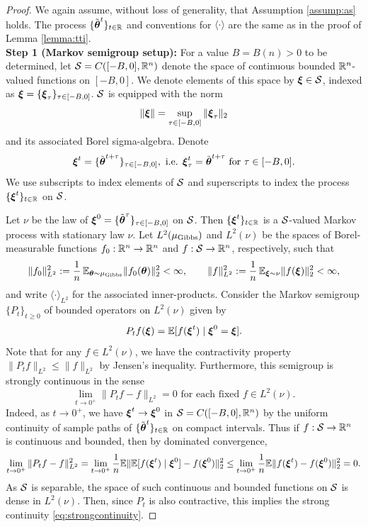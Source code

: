 \begin{proof}
We again assume, without loss of generality, that Assumption \ref{assump:as}
holds. The process $\{\tilde{\boldsymbol{\theta}}^t\}_{t \in \mathbb{R}}$ and conventions
for $\langle \cdot \rangle$ are the same as in the proof
of Lemma \ref{lemma:tti}.\\

{\bf Step 1 (Markov semigroup setup):} 
For a value $B=B(n)>0$ to be determined, let
$\mathcal{S}=C([-B,0],\mathbb{R}^n)$ denote the space of continuous bounded
$\mathbb{R}^n$-valued functions on $[-B,0]$. We denote elements of this space by
$\boldsymbol{\xi} \in \mathcal{S}$, indexed as $\boldsymbol{\xi}=\{\boldsymbol{\xi}_\tau\}_{\tau \in [-B,0]}$.
$\mathcal{S}$ is equipped with the norm
\[\|\boldsymbol{\xi}\|=\sup_{\tau \in [-B,0]} \|\boldsymbol{\xi}_\tau\|_2\]
and its associated Borel sigma-algebra. Denote
\[\boldsymbol{\xi}^t=\{\tilde {\boldsymbol{\theta}}^{t+\tau}\}_{\tau \in [-B,0]},
\text{ i.e. } \boldsymbol{\xi}_\tau^t=\tilde {\boldsymbol{\theta}}^{t+\tau} \text{ for } \tau \in
[-B,0].\]
We use subscripts to index elements of $\mathcal{S}$
and superscripts to index the process $\{\boldsymbol{\xi}^t\}_{t \in \mathbb{R}}$ on $\mathcal{S}$.

Let $\nu$ be the law of $\boldsymbol{\xi}^0=\{\tilde{\boldsymbol{\theta}}^\tau\}_{\tau \in [-B,0]}$
on $\mathcal{S}$. Then $\{\boldsymbol{\xi}^t\}_{t \in \mathbb{R}}$ is a
$\mathcal{S}$-valued Markov process with stationary law $\nu$.
Let $L^2(\mu_{\mathrm{Gibbs}})$ and $L^2(\nu)$ be the spaces of
Borel-measurable functions $f_0:\mathbb{R}^n \to \mathbb{R}^n$ and
$f:\mathcal{S} \to \mathbb{R}^n$, respectively, such that
\[\|f_0\|_{L^2}^2:=\frac{1}{n}\,\mathbb{E}_{\boldsymbol{\theta} \sim \mu_{\mathrm{Gibbs}}}
\|f_0(\boldsymbol{\theta})\|_2^2<\infty,\qquad \|f\|_{L^2}^2:=
\frac{1}{n}\,\mathbb{E}_{\boldsymbol{\xi} \sim \nu} \|f(\boldsymbol{\xi})\|_2^2<\infty,\]
and write $\langle \cdot \rangle_{L^2}$ for the associated inner-products.
Consider the Markov semigroup $\{P_t\}_{t \geq 0}$ of
bounded operators on $L^2(\nu)$ given by
\[P_t f(\boldsymbol{\xi})=\mathbb{E}[f(\boldsymbol{\xi}^t) \mid \boldsymbol{\xi}^0=\boldsymbol{\xi}].\]
Note that for any $f \in L^2(\nu)$, we have the contractivity property
$\|P_tf\|_{L^2} \leq \|f\|_{L^2}$ by Jensen's inequality. Furthermore,
this semigroup is strongly continuous in the sense
\begin{equation}\label{eq:strongcontinuity}
\lim_{t \to 0^+} \|P_tf-f\|_{L^2}=0 \text{ for each fixed } f \in L^2(\nu).
\end{equation}
Indeed, as $t \to 0^+$, we have $\boldsymbol{\xi}^t \to \boldsymbol{\xi}^0$ in
$\mathcal{S}=C([-B,0],\mathbb{R}^n)$ by the uniform continuity of sample paths of
$\{\tilde {\boldsymbol{\theta}}^t\}_{t \in \mathbb{R}}$ on compact intervals. Thus if
$f:\mathcal{S} \to \mathbb{R}^n$ is continuous and bounded, then by dominated convergence,
\[\lim_{t \to 0^+} \|P_tf-f\|_{L^2}^2
=\lim_{t \to 0^+} \frac{1}{n}\mathbb{E}\|\mathbb{E}[f(\boldsymbol{\xi}^t) \mid \boldsymbol{\xi}^0]-f(\boldsymbol{\xi}^0)\|_2^2
\leq \lim_{t \to 0^+} \frac{1}{n}\mathbb{E}\|f(\boldsymbol{\xi}^t)-f(\boldsymbol{\xi}^0)\|_2^2=0.\]
As $\mathcal{S}$ is separable,
the space of such continuous and bounded functions on $\mathcal{S}$
is dense in $L^2(\nu)$. Then, since $P_t$ is also contractive,
this implies the strong continuity \eqref{eq:strongcontinuity}. 


\end{proof}
